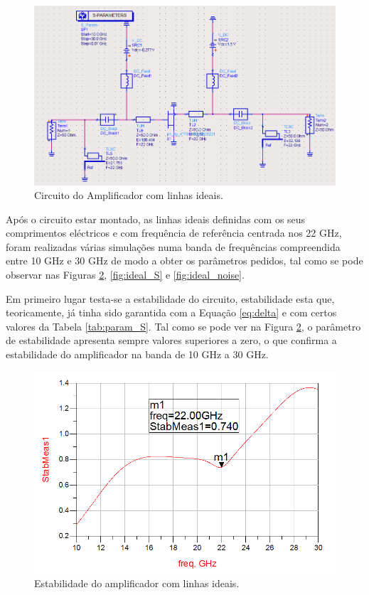\documentclass[11pt]{article}
\numberwithin{equation}{section}
\begin{document}
\begin{figure}[H]
	\centering
	\includegraphics[keepaspectratio=true, scale=0.41]{exps/Circuito_ideal}
	\vspace{-0.5em}
	\caption{Circuito do Amplificador com linhas ideais.}
	\vspace{-0.8em}
	\label{fig:circ_ideal}
\end{figure}
 
Após o circuito estar montado, as linhas ideais definidas com os seus comprimentos eléctricos e com frequência de referência centrada nos 22 GHz, foram realizadas várias simulações numa banda de frequências compreendida entre 10 GHz e 30 GHz de modo a obter os parâmetros pedidos, tal como se pode observar nas Figuras \ref{fig:ideal_estavel}, \ref{fig:ideal_S} e \ref{fig:ideal_noise}.

Em primeiro lugar testa-se a estabilidade do circuito, estabilidade esta que, teoricamente, já tinha sido garantida com a Equação \ref{eq:delta} e com certos valores da Tabela \ref{tab:param_S}. Tal como se pode ver na Figura \ref{fig:ideal_estavel}, o parâmetro de estabilidade apresenta sempre valores superiores a zero, o que confirma a estabilidade do amplificador na banda de 10 GHz a 30 GHz.

\begin{figure}[H]
	\centering
	\includegraphics[keepaspectratio=true, scale=0.45]{exps/Ideal_estab}
	\vspace{-0.5em}
	\caption{Estabilidade do amplificador com linhas ideais.}
	\vspace{-0.8em}
	\label{fig:ideal_estavel}
\end{figure}
\end{document}

